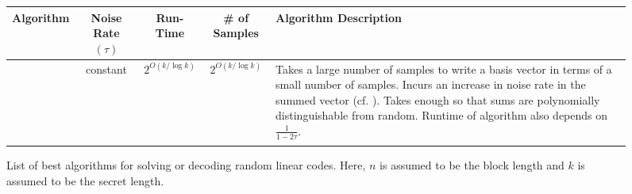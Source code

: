 \begin{figure}[!h]
\begin{center}
\bgroup
\renewcommand{\arraystretch}{1.5}
\begin{tabular}{|c|c|c|c|>{\centering}p{}|}
	\hline
	Algorithm & Noise Rate $(\tau)$ & Run-Time & \# of Samples & Algorithm Description \tabularnewline
	\hline\hline
	\cite{STOC:BluKalWas00} & constant & $2^{O(k/\log k)}$ & $2^{O(k/\log k)}$ & {\footnotesize Takes a large number of samples to write a basis vector in terms of a small number of samples. Incurs an increase in noise rate in the summed vector (cf. \cite[Lemma 4]{STOC:BluKalWas00}). Takes enough so that sums are polynomially distinguishable from random. Runtime of algorithm also depends on $\frac{1}{1-2\tau}$.} \tabularnewline
	\hline
	\cite{Levieil06}
\end{tabular}
\egroup
\end{center}
\caption{List of best algorithms for solving \LPN or decoding random linear codes.
Here, $n$ is assumed to be the block length and $k$ is assumed to be the secret length.}
\end{figure}